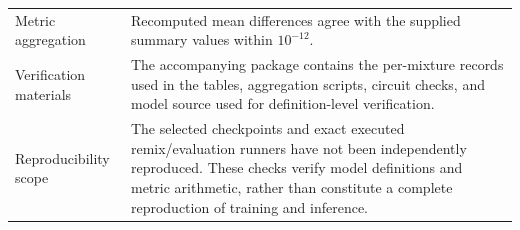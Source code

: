 \documentclass[10pt,a4paper]{article}
\begin{document}
\begin{table}[htbp]
\begin{tabularx}{\textwidth}{
    @{}p{}X@{}
}
Metric aggregation &
Recomputed mean differences agree with the supplied
summary values within $10^{-12}$. \\

Verification materials &
The accompanying package contains the per-mixture records
used in the tables, aggregation scripts, circuit checks,
and model source used for definition-level verification. \\

Reproducibility scope &
The selected checkpoints and exact executed
remix/evaluation runners have not been independently
reproduced. These checks verify model definitions and
metric arithmetic, rather than constitute a complete
reproduction of training and inference. \\

\bottomrule
\end{tabularx}
\end{table}
\end{document}
